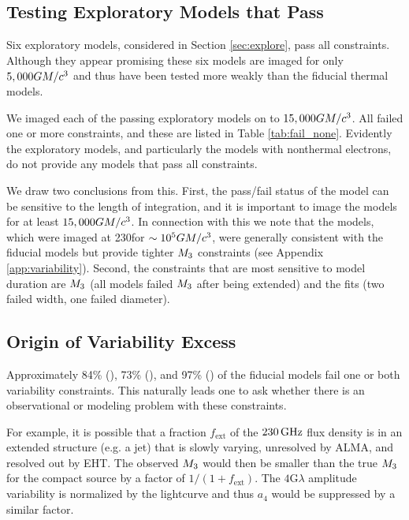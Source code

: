 \subsection{Testing Exploratory Models that Pass}

Six exploratory models, considered in Section \ref{sec:explore},  pass all constraints.
Although they appear promising these six models are imaged for only $5,000 GM/c^3$ and thus  have been tested more weakly than the fiducial thermal models.

We imaged each of the passing exploratory models on to $15,000 GM/c^3$.
All failed one or more constraints, and these are listed in Table \ref{tab:fail_none}.
Evidently the exploratory models, and particularly the models with nonthermal electrons, do not provide any models that pass all constraints.

We draw two conclusions from this.
First, the pass/fail status of the model can be sensitive to the length of integration, and it is important to image the models for at least $15,000GM/c^3$.
In connection with this we note that the \koral models, which were imaged at 230\GHz for $\sim 10^5 GM/c^3$, were generally consistent with the fiducial models but provide tighter $M_{3}$ constraints (see Appendix \ref{app:variability}).
Second, the constraints that are most sensitive to model duration are $M_{3}$ (all models failed $M_{3}$ after being extended) and the \mring fits (two failed \mring width, one failed \mring diameter).

\subsection{Origin of Variability Excess}

Approximately 84\% (\kharma), 73\% (\bhac), and 97\% (\hamr) of the fiducial models fail one or both variability constraints.
This naturally leads one to ask whether there is an observational or modeling problem with these constraints.

For example, it is possible that a fraction $f_\mathrm{ext}$ of the $230\,\mathrm{GHz}$ flux density is in an extended structure (e.g. a jet) that is slowly varying, unresolved by ALMA, and resolved out by EHT.
The observed $M_{3}$ would then be smaller than the true $M_{3}$ for the compact source by a factor of $1/(1 + f_\mathrm{ext})$.
The $4$G$\lambda$ amplitude variability is normalized by the lightcurve and thus $a_4$ would be suppressed by a similar factor.

